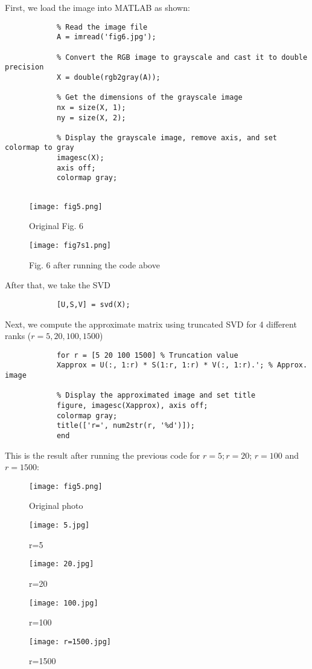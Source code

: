 \documentclass[a4paper]{article}
\begin{document}
{		First, we load the image into MATLAB as shown:
		\begin{lstlisting}
			% Read the image file
			A = imread('fig6.jpg');
			
			% Convert the RGB image to grayscale and cast it to double precision
			X = double(rgb2gray(A));
			
			% Get the dimensions of the grayscale image
			nx = size(X, 1);
			ny = size(X, 2);
			
			% Display the grayscale image, remove axis, and set colormap to gray
			imagesc(X);
			axis off;
			colormap gray;
			
		\end{lstlisting}
		\begin{figure}[H]
			\centering
			\texttt{[image: fig5.png]}
			\caption[Original Fig. 6]{Original Fig. 6\protect}
			\label{fig:example}
		\end{figure}
		
		
		
		\begin{figure}[H]
			\centering
			\texttt{[image: fig7s1.png]}
			\caption[7s1]{Fig. 6 after running the code above\protect}
			\label{fig:example}
		\end{figure}
		After that, we take the SVD
		\begin{lstlisting}
			[U,S,V] = svd(X);
		\end{lstlisting}
		Next, we compute the approximate matrix using truncated SVD for 4 different ranks ($r=5,20,100,1500$)
		\begin{lstlisting}
			for r = [5 20 100 1500] % Truncation value
			Xapprox = U(:, 1:r) * S(1:r, 1:r) * V(:, 1:r).'; % Approx. image
			
			% Display the approximated image and set title
			figure, imagesc(Xapprox), axis off;
			colormap gray;
			title(['r=', num2str(r, '%d')]);
			end   
		\end{lstlisting}
		This is the result after running the previous code for $r=5; r=20$; $r=100$ and $r=1500$:
		\begin{figure}[H]
			\centering
			\texttt{[image: fig5.png]}
			\caption[Original]{Original photo\protect}
			\label{fig:example}
		\end{figure}
		\begin{figure}[H]
			\centering
			\texttt{[image: 5.jpg]}
			\caption[r=5]{r=5\protect}
			\label{fig:example}
		\end{figure}
		\begin{figure}[H]
			\centering
			\texttt{[image: 20.jpg]}
			\caption[r=20]{r=20\protect}
			\label{fig:example}
		\end{figure}
		\begin{figure}[H]
			\centering
			\texttt{[image: 100.jpg]}
			\caption[r=100]{r=100\protect}
			\label{fig:example}
		\end{figure}
		\begin{figure}[H]
			\centering
			\texttt{[image: r=1500.jpg]}
			\caption[r=1500]{r=1500\protect}
			\label{fig:example}
		\end{figure}
		
}
\end{document}
